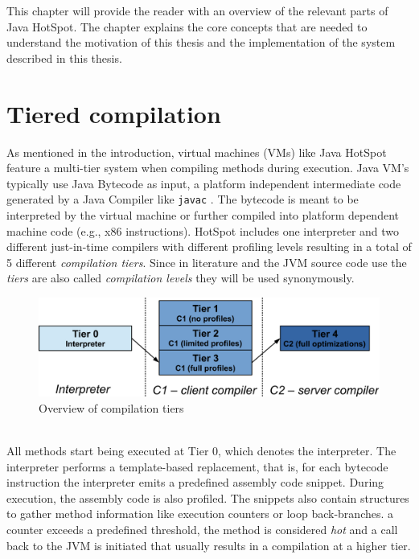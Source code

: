 This chapter will provide the reader with an overview of the relevant parts of Java HotSpot. The chapter explains the core concepts that are needed to understand the motivation of this thesis and the implementation of the system described in this thesis.

\section{Tiered compilation}
\label{sec:tiered}
As mentioned in the introduction, virtual machines (VMs) like Java HotSpot feature a multi-tier system when compiling methods during execution. 
Java VM's typically use Java Bytecode as input, a platform independent intermediate code generated by a Java Compiler like \texttt{javac} \cite{javac}.
The bytecode is meant to be interpreted by the virtual machine or further compiled into platform dependent machine code (e.g., x86 instructions).
HotSpot includes one interpreter and two different just-in-time compilers with different profiling levels resulting in a total of 5 different \textit{compilation tiers}. Since in literature and the JVM source code use the \textit{tiers} are also called \textit{compilation levels} they will be used synonymously. 
\begin{figure}[ht]
  \begin{center}
    \centering
    \includegraphics{figures/hs_tiers.png}
    \caption{Overview of compilation tiers}
    \label{f:hs_tiers}
  \end{center}
\end{figure}
\\
All methods start being executed at Tier 0, which denotes the interpreter.
The interpreter performs a template-based replacement, that is, for each bytecode instruction the interpreter emits a predefined assembly code snippet.
During execution, the assembly code is also profiled. The snippets also contain structures to gather method information like execution counters or loop back-branches. a counter exceeds a predefined threshold, the method is considered \textit{hot} and a call back to the JVM is initiated that usually results in a compilation at a higher tier.
